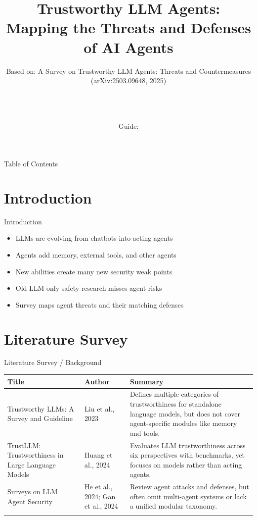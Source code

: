 \documentclass[10pt]{beamer}
\title[B.Tech Seminar]{Trustworthy LLM Agents: Mapping the Threats and Defenses of AI Agents}
\subtitle{Based on: A Survey on Trustworthy LLM Agents: Threats and Countermeasures (arXiv:2503.09648, 2025)}
\author[\studentname\ (\shortinst)]{\studentname \\ \small \rollno \\ \small \rollclass \\ \small Guide: \guidename}
\institute[]{\deptname \\ \collegename}
\date{\seminardate}
\begin{document}
\begin{frame}[plain]
  \titlepage
\end{frame}

\begin{frame}{Table of Contents}
  \tableofcontents
\end{frame}

\section{Introduction}
\begin{frame}{Introduction}
\begin{itemize}
  \item LLMs are evolving from chatbots into acting agents
  \item Agents add memory, external tools, and other agents
  \item New abilities create many new security weak points
  \item Old LLM-only safety research misses agent risks
  \item Survey maps agent threats and their matching defenses
\end{itemize}
\end{frame}

\section{Literature Survey}
\begin{frame}{Literature Survey / Background}
  \small
  \begin{tabular}{@{}p{2.7cm}p{2.3cm}p{5.6cm}@{}}
    \toprule
    \textbf{Title} & \textbf{Author} & \textbf{Summary} \\
    \midrule
    Trustworthy LLMs: A Survey and Guideline & Liu et al., 2023 & Defines multiple categories of trustworthiness for standalone language models, but does not cover agent-specific modules like memory and tools. \\
    \addlinespace
    TrustLLM: Trustworthiness in Large Language Models & Huang et al., 2024 & Evaluates LLM trustworthiness across six perspectives with benchmarks, yet focuses on models rather than acting agents. \\
    \addlinespace
    Surveys on LLM Agent Security & He et al., 2024; Gan et al., 2024 & Review agent attacks and defenses, but often omit multi-agent systems or lack a unified modular taxonomy. \\
    \addlinespace
    \bottomrule
  \end{tabular}
\end{frame}
\end{document}
